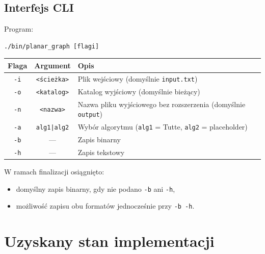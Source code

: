 \documentclass[12pt]{article}
\begin{document}
\subsection{Interfejs CLI}
Program:
\begin{verbatim}
./bin/planar_graph [flagi]
\end{verbatim}

\begin{center}
	\begin{tabular}{|c|c|p{7.5cm}|}
		\hline
		\textbf{Flaga} & \textbf{Argument}  & \textbf{Opis}                                                        \\
		\hline
		\texttt{-i}    & \texttt{<ścieżka>} & Plik wejściowy (domyślnie \texttt{input.txt})                        \\
		\hline
		\texttt{-o}    & \texttt{<katalog>} & Katalog wyjściowy (domyślnie bieżący)                                \\
		\hline
		\texttt{-n}    & \texttt{<nazwa>}   & Nazwa pliku wyjściowego bez rozszerzenia (domyślnie \texttt{output}) \\
		\hline
		\texttt{-a}    & \texttt{alg1|alg2} & Wybór algorytmu (\texttt{alg1} = Tutte, \texttt{alg2} = placeholder) \\
		\hline
		\texttt{-b}    & —                  & Zapis binarny                                                        \\
		\hline
		\texttt{-h}    & —                  & Zapis tekstowy                                                       \\
		\hline
	\end{tabular}
\end{center}

W ramach finalizacji osiągnięto:
\begin{itemize}
	\item domyślny zapis binarny, gdy nie podano \texttt{-b} ani \texttt{-h},
	\item możliwość zapisu obu formatów jednocześnie przy \texttt{-b -h}.
\end{itemize}

\section{Uzyskany stan implementacji}
\end{document}
